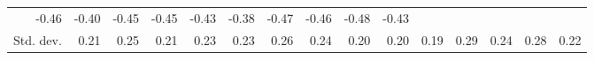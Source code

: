 \begin{tabular}{lllllllllllllll}
  \multicolumn{1}{r}{-0.46} &
  \multicolumn{1}{r}{-0.40} &
  \multicolumn{1}{r}{-0.45} &
  \multicolumn{1}{r}{-0.45} &
  \multicolumn{1}{r}{-0.43} &
  \multicolumn{1}{r}{-0.38} &
  \multicolumn{1}{r}{-0.47} &
  \multicolumn{1}{r}{-0.46} &
  \multicolumn{1}{r}{-0.48} &
  \multicolumn{1}{r}{-0.43} \\
\multicolumn{1}{l}{\hspace{2em}Std. dev.} &
  \multicolumn{1}{|r}{0.21} &
  \multicolumn{1}{r}{0.25} &
  \multicolumn{1}{r}{0.21} &
  \multicolumn{1}{r}{0.23} &
  \multicolumn{1}{r}{0.23} &
  \multicolumn{1}{r}{0.26} &
  \multicolumn{1}{r}{0.24} &
  \multicolumn{1}{r}{0.20} &
  \multicolumn{1}{r}{0.20} &
  \multicolumn{1}{r}{0.19} &
  \multicolumn{1}{r}{0.29} &
  \multicolumn{1}{r}{0.24} &
  \multicolumn{1}{r}{0.28} &
  \multicolumn{1}{r}{0.22} \\
\cline{1-15}
\end{tabular}
